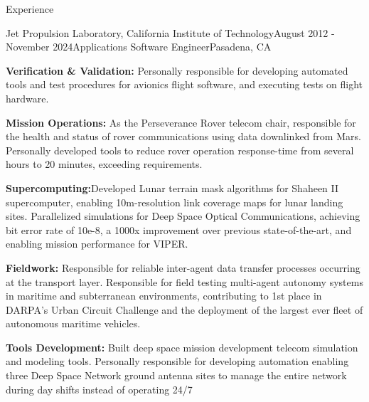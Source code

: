 \documentclass{resume} %
\begin{document}
\begin{rSection}{Experience}
\begin{rSubsection}{Jet Propulsion Laboratory, California Institute of Technology}{August 2012 - November 2024}{Applications Software Engineer}{Pasadena, CA}


\item {\bf{Verification \& Validation:}} Personally responsible for developing automated tools and test procedures for avionics flight software, and executing tests on flight hardware. 
 

\item {\bf{Mission Operations:}} As the Perseverance Rover telecom chair, responsible for the health and status of rover communications using data downlinked from Mars. Personally developed tools to reduce rover operation response-time from several hours to 20 minutes, exceeding requirements. 
 

\item {\bf{Supercomputing:}}Developed Lunar terrain mask algorithms for Shaheen II supercomputer, enabling 10m-resolution link coverage maps for lunar landing sites. Parallelized simulations for Deep Space Optical Communications, achieving bit error rate of 10e-8, a 1000x improvement over previous state-of-the-art, and enabling mission performance for VIPER. 

 

\item {\bf{Fieldwork:}} Responsible for reliable inter-agent data transfer processes occurring at the transport layer. Responsible for field testing multi-agent autonomy systems in maritime and subterranean environments, contributing to 1st place in DARPA’s Urban Circuit Challenge and the deployment of the largest ever fleet of autonomous maritime vehicles. 
 


\item {\bf{Tools Development:}}  Built deep space mission development telecom simulation and modeling tools. Personally responsible for developing automation enabling three Deep Space Network ground antenna sites to manage the entire network during day shifts instead of operating 24/7


\end{rSubsection}






\end{rSection}
\end{document}
